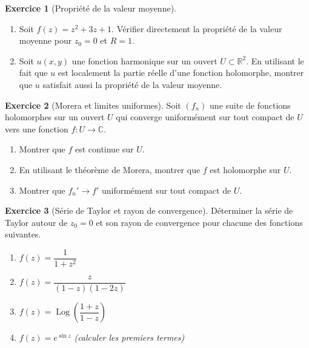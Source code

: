 \documentclass[12pt,a4paper,openany]{book}
\theoremstyle{definition}
\newtheorem{exercice}{Exercice}[chapter]
\theoremstyle{plain}
\theoremstyle{remark}
\newcommand{\C}{\mathbb{C}}
\newcommand{\R}{\mathbb{R}}
\DeclareMathOperator{\Log}{Log}
\begin{document}
\begin{exercice}[Propriété de la valeur moyenne]\label{exo:mean-value}
\begin{enumerate}[label=\textbf{\alph*)}]
  \item Soit $f(z) = z^2 + 3z + 1$. Vérifier directement la propriété
        de la valeur moyenne pour $z_0 = 0$ et $R = 1$.
  \item Soit $u(x,y)$ une fonction harmonique sur un ouvert
        $U \subset \R^2$. En utilisant le fait que $u$ est localement
        la partie réelle d'une fonction holomorphe, montrer que $u$
        satisfait aussi la propriété de la valeur moyenne.
\end{enumerate}
\end{exercice}

\begin{exercice}[Morera et limites uniformes]\label{exo:morera-limits}
Soit $(f_n)$ une suite de fonctions holomorphes sur un ouvert $U$
qui converge uniformément sur tout compact de $U$ vers une fonction
$f \colon U \to \C$.
\begin{enumerate}[label=\textbf{\alph*)}]
  \item Montrer que $f$ est continue sur $U$.
  \item En utilisant le théorème de Morera, montrer que $f$ est
        holomorphe sur $U$.
  \item Montrer que $f_n' \to f'$ uniformément sur tout compact de $U$.
\end{enumerate}
\end{exercice}

\begin{exercice}[Série de Taylor et rayon de convergence]\label{exo:taylor-radius}
Déterminer la série de Taylor autour de $z_0 = 0$ et son rayon de
convergence pour chacune des fonctions suivantes.
\begin{enumerate}[label=\textbf{\alph*)}]
  \item $f(z) = \dfrac{1}{1+z^2}$
  \item $f(z) = \dfrac{z}{(1-z)(1-2z)}$
  \item $f(z) = \Log\!\left(\dfrac{1+z}{1-z}\right)$
  \item $f(z) = e^{\sin z}$
  \emph{(calculer les premiers termes)}
\end{enumerate}
\end{exercice}
\end{document}
